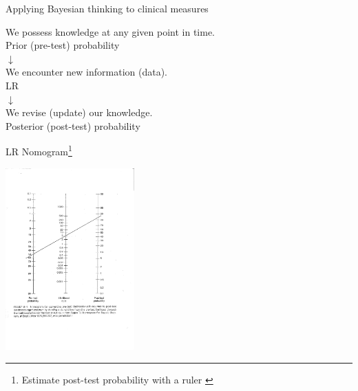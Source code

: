 \documentclass{beamer}
\begin{document}
% 
\begin{frame}{Applying Bayesian thinking to clinical measures}
	\begin{center}
	We possess knowledge at any given point in time. \\
	 \alert{Prior (pre-test) probability} \\
	$\downarrow$ \\ 
	We encounter new information (data). \\
	 \alert{LR} \\
	$\downarrow$ \\ 
	We revise (update) our knowledge. \\
	 \alert{Posterior (post-test) probability} 
	\end{center}
\end{frame}

% 
\begin{frame}{LR Nomogram\footnote{\tiny{Estimate post-test probability with a ruler \citep[p. 285]{Haynes2006}}}}
	\begin{center}
	\includegraphics[height=7cm]{images/nomogram_haynes_2006.pdf}
	\end{center}	
\end{frame}

%
\end{document}
